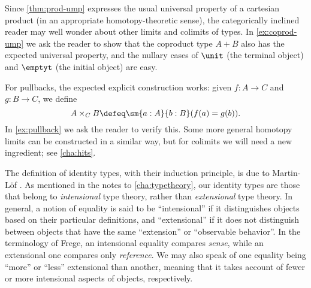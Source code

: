 %
%
%
%
Since \cref{thm:prod-ump} expresses the usual universal property of a cartesian product (in an appropriate homotopy-theoretic sense), the categorically inclined reader may well wonder about other limits and colimits of types.
In \cref{ex:coprod-ump} we ask the reader to show that the coproduct type $A+B$ also has the expected universal property, and the nullary cases of $\unit$ (the terminal object) and $\emptyt$ (the initial object) are easy.
%
%
%
%

%
For pullbacks, the expected explicit construction works: given $f:A\to C$ and $g:B\to C$, we define
\begin{equation}
  A\times_C B \defeq \sm{a:A}{b:B} (f(a)=g(b)).\label{eq:defn-pullback}
\end{equation}
In \cref{ex:pullback} we ask the reader to verify this.
Some more general homotopy limits can be constructed in a similar way, but for colimits we will need a new ingredient; see \cref{cha:hits}.

%

\sectionNotes

The definition of identity types, with their induction principle, is due to Martin-L\"of \cite{Martin-Lof-1973}.
%
%
%
%
%
As mentioned in the notes to \cref{cha:typetheory}, our identity types are those that belong to \emph{intensional} type theory, rather than \emph{extensional} type theory.
In general, a notion of equality is said to be ``intensional'' if it distinguishes objects based on their particular definitions, and ``extensional'' if it does not distinguish between objects that have the same ``extension'' or ``observable behavior''.
In the terminology of Frege, an intensional equality compares \emph{sense}, while an extensional one compares only \emph{reference}.
We may also speak of one equality being ``more'' or ``less'' extensional than another, meaning that it takes account of fewer or more intensional aspects of objects, respectively.

